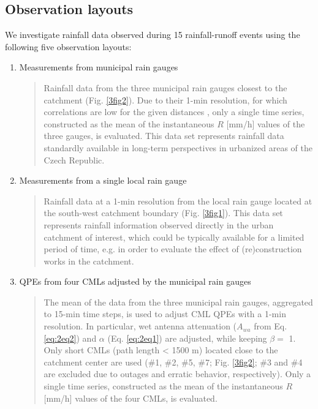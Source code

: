 \documentclass{ctuthesis}\usepackage[]{graphicx}\usepackage[]{color}
\begin{document}
\subsection{Observation layouts} 

We investigate rainfall data observed during 15 rainfall-runoff events using  the following five observation layouts: 
\begin{enumerate}
         \item Measurements from municipal rain gauges
                \begin{quote}
                Rainfall data from the three municipal rain gauges closest to the catchment (Fig. \ref{3fig2}). Due to their 1-min resolution, for which correlations are low for the given distances \citep{villariniRainfallSamplingUncertainties2008}, only a  single time series, constructed as the mean of the instantaneous $R$ [mm/h] values of the three gauges, is evaluated.
                This data set represents rainfall data standardly available in long-term perspectives in urbanized areas of the Czech Republic.
                \end{quote}
        \item Measurements from a single local rain gauge 
                \begin{quote}
                Rainfall data at a 1-min resolution from the local rain gauge located at the south-west catchment boundary (Fig. \ref{3fig1}).
                This data set represents rainfall information observed directly in the urban catchment of interest, which could be typically available for a limited period of time, e.g. in order to evaluate the effect of (re)construction works in the catchment.
                \end{quote}
        \item QPEs from four CMLs adjusted by the municipal rain gauges 
                \begin{quote}
                The mean of the data from the three municipal rain gauges, aggregated to 15-min time steps, is used to adjust \citep{fenclGaugeadjustedRainfallEstimates2017} CML QPEs with a 1-min resolution. In particular, wet antenna attenuation ($A_{wa}$ from Eq. \ref{eq:2eq2}) and $\alpha$ (Eq. \ref{eq:2eq1}) are adjusted, while keeping $\beta =$ 1. Only short CMLs (path length < 1500 m) located close to the catchment center are used (\#1, \#2, \#5, \#7; Fig. \ref{3fig2}; \#3 and \#4 are excluded due to outages and erratic behavior, respectively). Only a single time series, constructed as the mean of the instantaneous $R$ [mm/h] values of the four CMLs, is evaluated.

\end{quote}
\end{enumerate}
\end{document}

